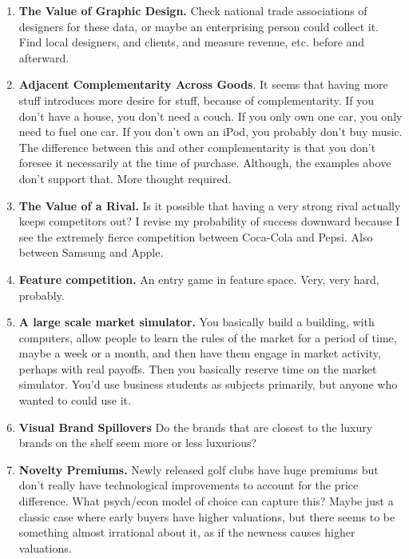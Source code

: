\documentclass[paper=a4, fontsize=11pt]{scrartcl} %
\numberwithin{equation}{section} %
\numberwithin{figure}{section} %
\numberwithin{table}{section} %
\begin{document}
\begin{enumerate}
\item \textbf{The Value of Graphic Design.}  Check national trade associations of designers for these data, or maybe an enterprising person could collect it.  Find local designers, and clients, and measure revenue, etc. before and afterward.  

\item \textbf{Adjacent Complementarity Across Goods}.  It seems that having more stuff introduces more desire for stuff, because of complementarity.  If you don't have a house, you don't need a couch.  If you only own one car, you only need to fuel one car.  If you don't own an iPod, you probably don't buy music.  The difference between this and other complementarity is that you don't foresee it necessarily at the time of purchase.  Although, the examples above don't support that.  More thought required.

\item \textbf{The Value of a Rival.}  Is it possible that having a very strong rival actually keeps competitors out?  I revise my probability of success downward because I see the extremely fierce competition between Coca-Cola and Pepsi.  Also between Samsung and Apple.  

\item \textbf{Feature competition.}  An entry game in feature space.  Very, very hard, probably. 

\item \textbf{A large scale market simulator.}  You basically build a building, with computers, allow people to learn the rules of the market for a period of time, maybe a week or a month, and then have them engage in market activity, perhaps with real payoffs.  Then you basically reserve time on the market simulator.  You'd use business students as subjects primarily, but anyone who wanted to could use it.

\item \textbf{Visual Brand Spillovers}  Do the brands that are closest to the luxury brands on the shelf seem more or less luxurious?

\item \textbf{Novelty Premiums.}  Newly released golf clubs have huge premiums but don't really have technological improvements to account for the price difference.  What psych/econ model of choice can capture this?  Maybe just a classic case where early buyers have higher valuations, but there seems to be something almost irrational about it, as if the newness causes higher valuations.  
   

\end{enumerate}
\end{document}
